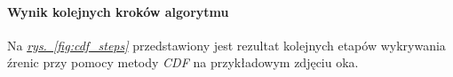 \paragraph{Wynik kolejnych kroków algorytmu}
Na \hyperref[{fig:cdf_steps}]{\textit{rys.~\ref{fig:cdf_steps}}} przedstawiony jest rezultat kolejnych etapów wykrywania źrenic przy pomocy metody \textit{CDF} na przykładowym zdjęciu oka.

